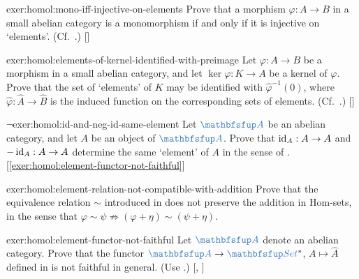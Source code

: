 \begin{exer}{}{exer:homol:mono-iff-injective-on-elements}
  \exerused{} Prove that a morphism $\varphi : A \to B$ in a small
  abelian category is a monomorphism if and only if it is injective on
  `elements'. (Cf.\ .)
  []
\end{exer}
\begin{exer}{}{exer:homol:elements-of-kernel-identified-with-preimage}
  \exerused{} Let $\varphi : A \to B$ be a morphism in a small abelian
  category, and let $\ker\varphi : K \to A$ be a kernel of $\varphi$.
  Prove that the set of `elements' of $K$ may be identified with
  $\hat{\varphi}^{-1}(0)$, where $\hat{\varphi} : \hat{A} \to \hat{B}$
  is the induced function on the corresponding sets of elements. (Cf.\
  .)
  []
\end{exer}
\begin{exer}{$\lnot$}{exer:homol:id-and-neg-id-same-element}
  Let $\categ{A}$ be an abelian category, and let $A$ be an object of
  $\categ{A}$. Prove that $\operatorname{id}_A : A \to A$ and $-\operatorname{id}_A : A \to A$
  determine the same `element' of $A$ in the sense of
  . [\ref{exer:homol:element-functor-not-faithful}]
\end{exer}
\begin{exer}{}{exer:homol:element-relation-not-compatible-with-addition}
  Prove that the equivalence relation $\sim$ introduced in
  does not preserve the addition in Hom-sets, in the sense that
  $\varphi \sim \psi \not\Rightarrow (\varphi + \eta) \sim (\psi +
  \eta)$.
\end{exer}
\begin{exer}{}{exer:homol:element-functor-not-faithful}
  \exerused{} Let $\categ{A}$ denote an abelian category. Prove that
  the functor $\categ{A} \to \categ{Set}^*$, $A \mapsto \hat{A}$
  defined in
  is not faithful in general. (Use
  .)
  [,
  \Cref{subsec:homol:what-is-missing}]
\end{exer}
